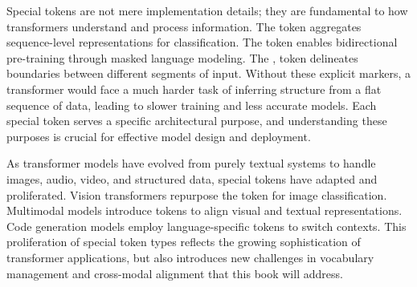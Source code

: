 Special tokens are not mere implementation details; they are fundamental to how transformers understand and process information. The \cls{} token aggregates sequence-level representations for classification. The \mask{} token enables bidirectional pre-training through masked language modeling. The \sep{} token delineates boundaries between different segments of input. Without these explicit markers, a transformer would face a much harder task of inferring structure from a flat sequence of data, leading to slower training and less accurate models. Each special token serves a specific architectural purpose, and understanding these purposes is crucial for effective model design and deployment.
\begin{comment}
Feedback: This paragraph is good at defining the "what." To avoid it feeling like a list of definitions, you could add a sentence or two about the "why." For example, after explaining the tokens, you could add something like: "Without these explicit markers, a transformer would face a much harder task of inferring structure from a flat sequence of data, leading to slower training and less accurate models." This emphasizes the problem they solve.

STATUS: addressed - added explanation of why special tokens are necessary (without them, transformers would struggle with structure inference)
\end{comment}

As transformer models have evolved from purely textual systems to handle images, audio, video, and structured data, special tokens have adapted and proliferated. Vision transformers repurpose the \cls{} token for image classification. Multimodal models introduce \img{} tokens to align visual and textual representations. Code generation models employ language-specific tokens to switch contexts. This proliferation of special token types reflects the growing sophistication of transformer applications, but also introduces new challenges in vocabulary management and cross-modal alignment that this book will address.
\begin{comment}
Feedback: The term "explosion" is a bit cliché in technical writing. Consider a more precise alternative like "This proliferation of special tokens..." or "This diversification...". Also, the examples are great. Could you perhaps hint at the challenges this proliferation creates? E.g., "This proliferation... reflects the growing sophistication... but also introduces new challenges in vocabulary management and cross-modal alignment that this book will address."

STATUS: addressed - replaced "explosion" with "proliferation" and added mention of challenges this creates
\end{comment}

